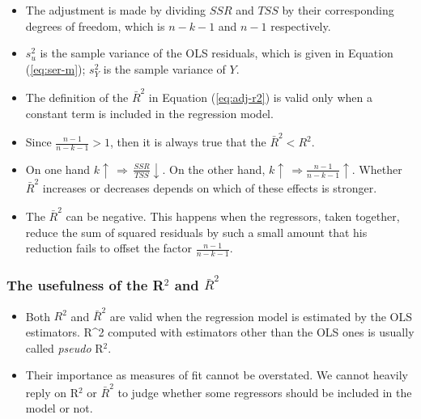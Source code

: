 \documentclass[a4paper,11pt]{article}
\begin{document}
\begin{itemize}
\item The adjustment is made by dividing \(SSR\) and \(TSS\) by their
corresponding degrees of freedom, which is \(n-k-1\) and \(n-1\)
respectively.
\item \(s^2_u\) is the sample variance of the OLS residuals, which is given
in Equation (\ref{eq:ser-m}); \(s^2_Y\) is the sample variance of \(Y\).
\item The definition of the \(\bar{R}^2\) in Equation (\ref{eq:adj-r2}) is
valid only when a constant term is included in the regression
model.
\item Since \(\frac{n-1}{n-k-1} > 1\), then it is always true that
the \(\bar{R}^2 < R^2\).
\item On one hand \(k \uparrow\, \Rightarrow\, \frac{SSR}{TSS} \downarrow\). On
the other hand, \(k \uparrow\, \Rightarrow \frac{n-1}{n-k-1}
  \uparrow\). Whether \(\bar{R}^2\) increases or decreases depends on
which of these effects is stronger.
\item The \(\bar{R}^2\) can be negative. This happens when the regressors,
taken together, reduce the sum of squared residuals by such a small
amount that his reduction fails to offset the factor \(\frac{n-1}{n-k-1}\).
\end{itemize}

\subsubsection*{The usefulness of the R\(^{\text{2}}\) and \(\bar{R}^2\)}
\label{sec:orgfdf3693}
\begin{itemize}
\item Both \(R^2\) and \(\bar{R}^2\) are valid when the regression model is
estimated by the OLS estimators. R\^{}2 computed with estimators other
than the OLS ones is usually called \emph{pseudo} R\(^{\text{2}}\).
\item Their importance as measures of fit cannot be overstated. We cannot heavily
reply on R\(^{\text{2}}\) or \(\bar{R}^2\) to judge whether some regressors should
be included in the model or not.
\end{itemize}
\end{document}
